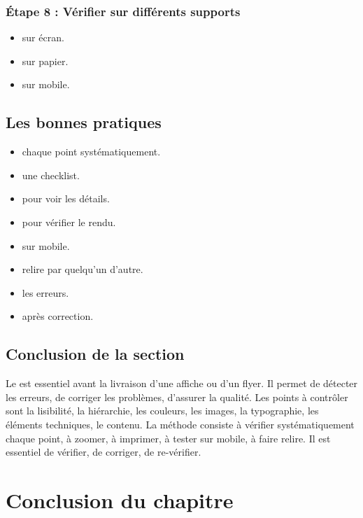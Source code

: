 \subsubsection{Étape 8 : Vérifier sur différents supports}

\begin{itemize}
    \item {} sur écran.
    \item {} sur papier.
    \item {} sur mobile.
\end{itemize}

\subsection{Les bonnes pratiques}

\begin{itemize}
    \item {} chaque point systématiquement.
    \item {} une checklist.
    \item {} pour voir les détails.
    \item {} pour vérifier le rendu.
    \item {} sur mobile.
    \item {} relire par quelqu'un d'autre.
    \item {} les erreurs.
    \item {} après correction.
\end{itemize}

\subsection*{Conclusion de la section}

Le  est essentiel avant la livraison d'une affiche ou d'un flyer. Il permet de détecter les erreurs, de corriger les problèmes, d'assurer la qualité. Les points à contrôler sont la lisibilité, la hiérarchie, les couleurs, les images, la typographie, les éléments techniques, le contenu. La méthode consiste à vérifier systématiquement chaque point, à zoomer, à imprimer, à tester sur mobile, à faire relire. Il est essentiel de vérifier, de corriger, de re-vérifier.

\section*{Conclusion du chapitre}

